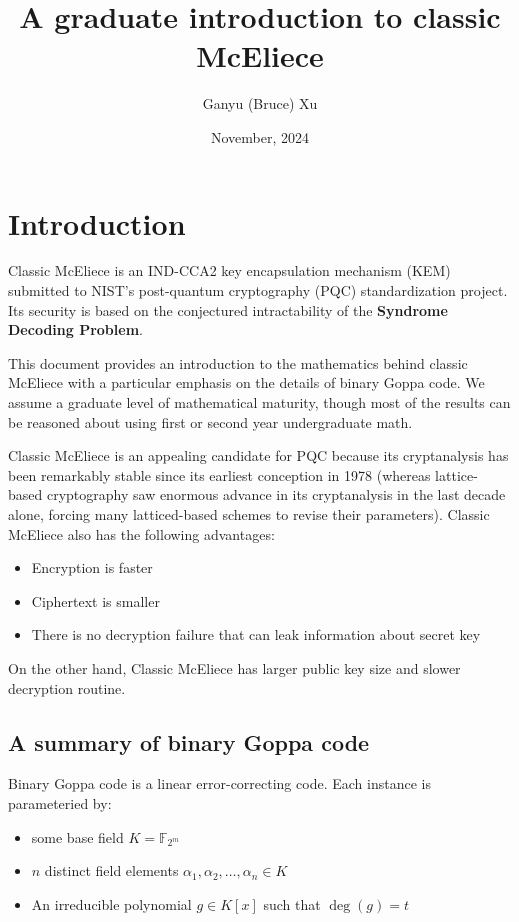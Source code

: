 \documentclass{article}
\title{
    A graduate introduction to classic McEliece
}
\author{
    Ganyu (Bruce) Xu
}
\date{November, 2024}
\begin{document}
\maketitle

\section{Introduction}
Classic McEliece is an IND-CCA2 key encapsulation mechanism (KEM) submitted to NIST's post-quantum cryptography (PQC) standardization project. Its security is based on the conjectured intractability of the \textbf{Syndrome Decoding Problem}.

This document provides an introduction to the mathematics behind classic McEliece with a particular emphasis on the details of binary Goppa code. We assume a graduate level of mathematical maturity, though most of the results can be reasoned about using first or second year undergraduate math.

Classic McEliece is an appealing candidate for PQC because its cryptanalysis has been remarkably stable since its earliest conception in 1978 \cite{mceliece1978public} (whereas lattice-based cryptography saw enormous advance in its cryptanalysis in the last decade alone, forcing many latticed-based schemes to revise their parameters). Classic McEliece also has the following advantages: \begin{itemize}
    \item Encryption is faster
    \item Ciphertext is smaller
    \item There is no decryption failure that can leak information about secret key
\end{itemize}

On the other hand, Classic McEliece has larger public key size and slower decryption routine.

\subsection{A summary of binary Goppa code}
Binary Goppa code is a linear error-correcting code. Each instance is parameteried by: \begin{itemize}
    \item some base field $K = \mathbb{F}_{2^m}$
    \item $n$ distinct field elements $\alpha_1, \alpha_2, \ldots, \alpha_n \in K$
    \item An irreducible polynomial $g \in K[x]$ such that $\deg(g) = t$
\end{itemize} 
\end{document}
